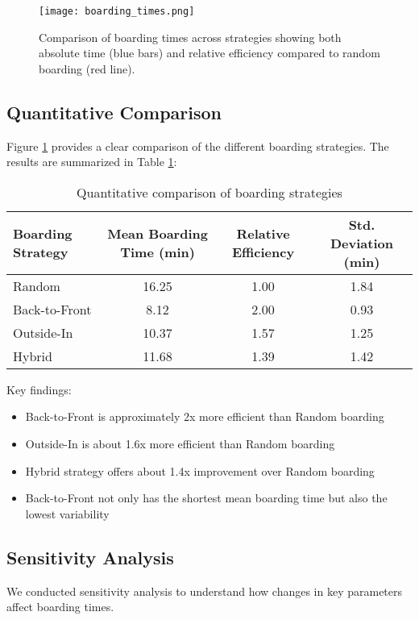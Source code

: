 \documentclass[12pt,a4paper]{article}
\begin{document}
\begin{figure}[H]
\centering
\texttt{[image: boarding\_times.png]}
\caption{Comparison of boarding times across strategies showing both absolute time (blue bars) and relative efficiency compared to random boarding (red line).}
\label{fig:boarding_times}
\end{figure}

\subsection{Quantitative Comparison}
Figure \ref{fig:boarding_times} provides a clear comparison of the different boarding strategies. The results are summarized in Table \ref{tab:boarding_comparison}:

\begin{table}[H]
\centering
\begin{tabular}{|l|c|c|c|}
\hline
\textbf{Boarding Strategy} & \textbf{Mean Boarding Time (min)} & \textbf{Relative Efficiency} & \textbf{Std. Deviation (min)} \\ \hline
Random & 16.25 & 1.00 & 1.84 \\ \hline
Back-to-Front & 8.12 & 2.00 & 0.93 \\ \hline
Outside-In & 10.37 & 1.57 & 1.25 \\ \hline
Hybrid & 11.68 & 1.39 & 1.42 \\ \hline
\end{tabular}
\caption{Quantitative comparison of boarding strategies}
\label{tab:boarding_comparison}
\end{table}

Key findings:
\begin{itemize}
    \item Back-to-Front is approximately 2x more efficient than Random boarding
    \item Outside-In is about 1.6x more efficient than Random boarding
    \item Hybrid strategy offers about 1.4x improvement over Random boarding
    \item Back-to-Front not only has the shortest mean boarding time but also the lowest variability
\end{itemize}

\subsection{Sensitivity Analysis}
We conducted sensitivity analysis to understand how changes in key parameters affect boarding times.
\end{document}

